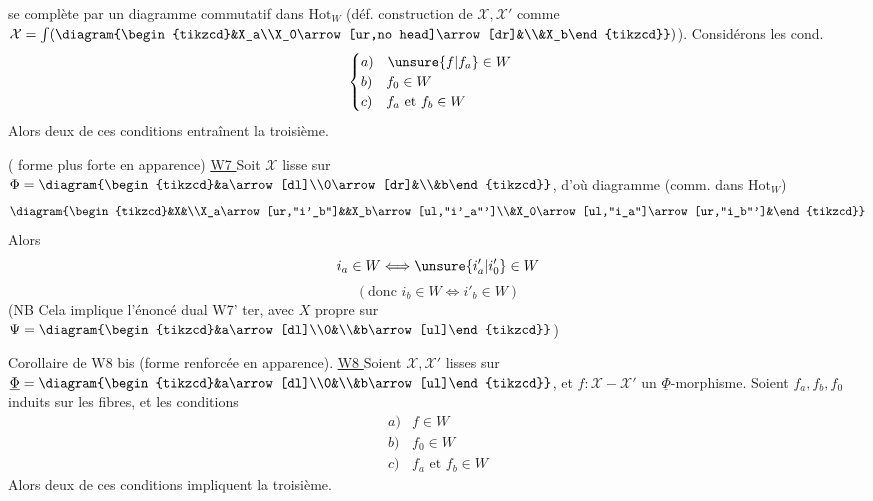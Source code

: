se complète par un diagramme commutatif dans $\mathrm{Hot}_W$ (déf. construction de $\mathcal X,\mathcal X'$ comme $\mathcal X=\int(\diagram{\begin{tikzcd}&X_a\\X_0\arrow[ur,no head]\arrow[dr]&\\&X_b\end{tikzcd}})$). Considérons les cond.
\[\begin{cases}a)\quad\unsure{f|f_a}\in W\\b)\quad f_0\in W\\c)\quad f_a\text{ et }f_b\in W\end{cases}\]
Alors deux de ces conditions entraînent la troisième.

 ( forme plus forte en apparence)
\uline{W7 } Soit $\mathcal X$ lisse sur $\Phi=\diagram{\begin{tikzcd}&a\arrow[dl]\\0\arrow[dr]&\\&b\end{tikzcd}}$, d'où diagramme (comm. dans $\mathrm{Hot}_W$)
\[\diagram{\begin{tikzcd}&X&\\X_a\arrow[ur,"i'_b"]&&X_b\arrow[ul,"i'_a"']\\&X_0\arrow[ul,"i_a"]\arrow[ur,"i_b"']&\end{tikzcd}}\]
Alors
\[i_a\in W\Longleftrightarrow\unsure{i'_a|i'_0}\in W\]
\[(\text{donc }i_b\in W\Longleftrightarrow i'_b\in W)\]
(NB Cela implique l'énoncé dual W7' ter, avec $X$ propre sur $\Psi=\diagram{\begin{tikzcd}&a\arrow[dl]\\0&\\&b\arrow[ul]\end{tikzcd}}$)

Corollaire de W8 bis (forme renforcée en apparence).
\uline{W8 } Soient $\mathcal X,\mathcal X'$ lisses sur $\underline\Phi=\diagram{\begin{tikzcd}&a\arrow[dl]\\0&\\&b\arrow[ul]\end{tikzcd}}$, et $f:\mathcal X-\mathcal X'$ un $\underline\Phi$-morphisme. Soient $f_a,f_b,f_0$ induits sur les fibres, et les conditions
\[\begin{array}{ll}a)&f\in W\\b)&f_0\in W\\c)&f_a\text{ et }f_b\in W\end{array}\]
Alors deux de ces conditions impliquent la troisième.

